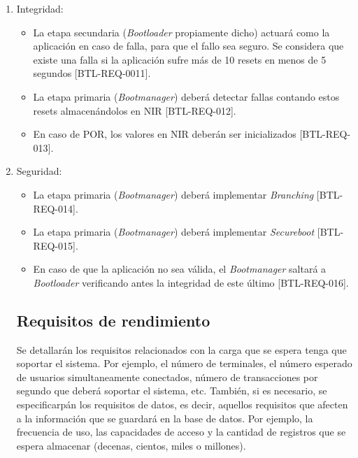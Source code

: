 \documentclass[12pt,a4paper]{article}
\begin{document}
\begin{itemize}
\begin{itemize}
\begin{enumerate}
	\item Integridad:
		\begin{itemize}
			\item La etapa secundaria (\textit{Bootloader} propiamente dicho) actuará como la aplicación en caso de falla, para que el fallo sea seguro. Se considera que existe una falla si la aplicación sufre más de 10 resets en menos de 5 segundos [BTL-REQ-0011].
			
			\item La etapa primaria (\textit{Bootmanager}) deberá detectar fallas contando estos resets almacenándolos en NIR [BTL-REQ-012].
			
			\item En caso de POR, los valores en NIR deberán ser inicializados [BTL-REQ-013].
		\end{itemize}
		
	\item Seguridad:
		\begin{itemize}
			\item La etapa primaria (\textit{Bootmanager}) deberá implementar \textit{Branching} [BTL-REQ-014].
		
			\item La etapa primaria (\textit{Bootmanager}) deberá implementar \textit{Secureboot} [BTL-REQ-015].
			
			\item En caso de que la aplicación no sea válida, el \textit{Bootmanager} saltará a \textit{Bootloader} verificando antes la integridad de este último [BTL-REQ-016].
		\end{itemize}
\begin{enumerate}


\subsection{Requisitos de rendimiento}
\label{sec:performance_requirements}

Se detallarán los requisitos relacionados con la carga que se espera
tenga que soportar el sistema. Por ejemplo, el número de terminales,
el número esperado de usuarios simultaneamente conectados, número de
transacciones por segundo que deberá soportar el sistema, etc.
  También, si es necesario, se especificarpán los requisitos de
datos, es decir, aquellos requisitos que afecten a la información
que se guardará en la base de datos. Por ejemplo, la frecuencia de
uso, las capacidades de acceso y la cantidad de registros que se
espera almacenar (decenas, cientos, miles o millones).



\end{enumerate}
\end{enumerate}
\end{itemize}
\end{itemize}
\end{document}
